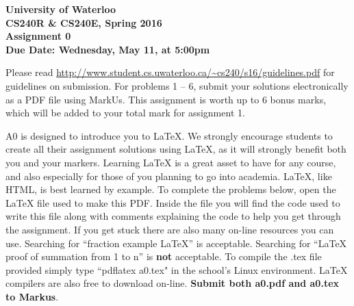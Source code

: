 \documentclass[12pt]{article}
\begin{document}
\begin{center}
{\Large\bf University of Waterloo}\\
\vspace{3mm}
{\Large\bf CS240R \& CS240E, Spring 2016}\\
\vspace{2mm}
{\Large\bf Assignment 0}\\
\vspace{3mm}
\textbf{Due Date: Wednesday, May 11, at 5:00pm}
\end{center}

\def\question#1{\item[\bf #1.]}
\def\part#1{\item[\bf #1)]}
\newcommand{\pc}[1]{\mbox{\textbf{#1}}} %

Please read
\url{http://www.student.cs.uwaterloo.ca/~cs240/s16/guidelines.pdf}
for guidelines on submission.  For problems 1 -- 6, submit your
solutions electronically as a PDF file using MarkUs.
This assignment is worth up to 6 bonus marks, which will be added to
your total mark for assignment 1.


A0 is designed to introduce you to \LaTeX{}.
We strongly encourage students to create all their assignment solutions using \LaTeX{},
as it will strongly benefit both you and your markers. Learning \LaTeX{} is a great asset 
to have for any course, and also especially for those of you planning to go into academia.
\LaTeX{}, like HTML, is best learned by example. To complete the problems below, open the 
\LaTeX{} file used to make this PDF. Inside the file you will find the code used to write this
file along with comments explaining the code to help you get through the assignment. If you get
stuck there are also many on-line resources you can use. Searching for ``fraction example \LaTeX{}'' 
is acceptable. Searching for ``\LaTeX{} proof of summation from 1 to n'' 
is {\bf not} acceptable. To compile the .tex file provided simply type ``pdflatex a0.tex" 
in the school's Linux environment. \LaTeX{}  compilers are also free to download on-line.
{\bf Submit both a0.pdf and a0.tex to Markus}.
\end{document}
